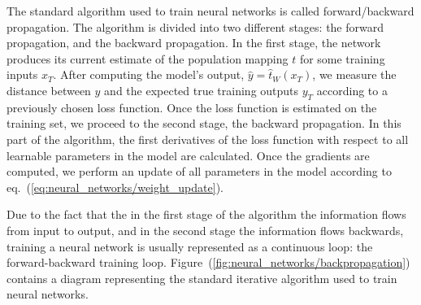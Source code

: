 The standard algorithm used to train neural networks is called forward/backward propagation. The
algorithm is divided into two different stages: the forward propagation, and the backward
propagation. In the first stage, the network produces its current estimate of the population mapping
$t$ for some training inputs $x_T$. After computing the model's output, $\hat{y} = \hat{t}_W(x_T)$,
we measure the distance between $\hat{y}$ and the expected true training outputs $y_T$ according to
a previously chosen loss function. Once the loss function is estimated on the training set, we
proceed to the second stage, the backward propagation. In this part of the algorithm, the first
derivatives of the loss function with respect to all learnable parameters in the model are
calculated. Once the gradients are computed, we perform an update of all parameters in the model
according to eq.~(\ref{eq:neural_networks/weight_update}).

Due to the fact that the in the first stage of the algorithm the information flows from input to
output, and in the second stage the information flows backwards, training a neural network is
usually represented as a continuous loop: the forward-backward training loop.
Figure~(\ref{fig:neural_networks/backpropagation}) contains a diagram representing the standard
iterative algorithm used to train neural networks.

